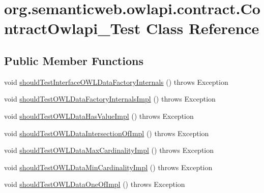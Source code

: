 \hypertarget{classorg_1_1semanticweb_1_1owlapi_1_1contract_1_1_contract_owlapi__2_test}{\section{org.\-semanticweb.\-owlapi.\-contract.\-Contract\-Owlapi\-\_\-Test Class Reference}
\label{classorg_1_1semanticweb_1_1owlapi_1_1contract_1_1_contract_owlapi__2_test}
}
\subsection*{Public Member Functions}
\begin{DoxyCompactItemize}
\item 
void \hyperlink{classorg_1_1semanticweb_1_1owlapi_1_1contract_1_1_contract_owlapi__2_test_aaa8ffd673173c780ef47c789b777ac0e}{should\-Test\-Interface\-O\-W\-L\-Data\-Factory\-Internals} ()  throws Exception 
\item 
void \hyperlink{classorg_1_1semanticweb_1_1owlapi_1_1contract_1_1_contract_owlapi__2_test_a722627605b137bf359e809d38e1ac87d}{should\-Test\-O\-W\-L\-Data\-Factory\-Internals\-Impl} ()  throws Exception 
\item 
void \hyperlink{classorg_1_1semanticweb_1_1owlapi_1_1contract_1_1_contract_owlapi__2_test_a3fba397a3a5fcbff0fd86f121fc0ce12}{should\-Test\-O\-W\-L\-Data\-Has\-Value\-Impl} ()  throws Exception 
\item 
void \hyperlink{classorg_1_1semanticweb_1_1owlapi_1_1contract_1_1_contract_owlapi__2_test_a22531846520695b601eaf7284c2e2c2b}{should\-Test\-O\-W\-L\-Data\-Intersection\-Of\-Impl} ()  throws Exception 
\item 
void \hyperlink{classorg_1_1semanticweb_1_1owlapi_1_1contract_1_1_contract_owlapi__2_test_a088b8d0f446066d8b2d05b7d9989a93c}{should\-Test\-O\-W\-L\-Data\-Max\-Cardinality\-Impl} ()  throws Exception 
\item 
void \hyperlink{classorg_1_1semanticweb_1_1owlapi_1_1contract_1_1_contract_owlapi__2_test_a2f6ee792a2a670654312a5d1691e991e}{should\-Test\-O\-W\-L\-Data\-Min\-Cardinality\-Impl} ()  throws Exception 
\item 
void \hyperlink{classorg_1_1semanticweb_1_1owlapi_1_1contract_1_1_contract_owlapi__2_test_aa0491c44e289c9b04328d919ea298156}{should\-Test\-O\-W\-L\-Data\-One\-Of\-Impl} ()  throws Exception 
\item 

\end{DoxyCompactItemize}
